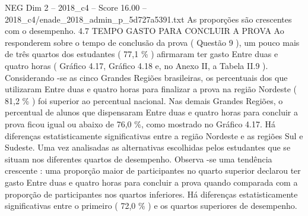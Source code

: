 \begin{textsample}{NEG Dim 2 – 2018\_c4 – Score 16.00 – 2018\_c4/enade\_2018\_admin\_p\_5d727a5391.txt}
As proporções são crescentes com o desempenho. 4.7 TEMPO GASTO PARA CONCLUIR A PROVA Ao responderem sobre o tempo de conclusão da prova ( Questão 9 ), um pouco mais de três quartos dos estudantes ( 77,1 \% ) afirmaram ter gasto Entre duas e quatro horas ( Gráfico 4.17, Gráfico 4.18 e, no Anexo II, a Tabela II.9 ).
Considerando -se as cinco Grandes Regiões brasileiras, os percentuais dos que utilizaram Entre duas e quatro horas para finalizar a prova na região Nordeste ( 81,2 \% ) foi superior ao percentual nacional.
Nas demais Grandes Regiões, o percentual de alunos que dispensaram Entre duas e quatro horas para concluir a prova ficou igual ou abaixo de 76,0 \%, como mostrado no Gráfico 4.17.
Há diferenças estatisticamente significativas entre a região Nordeste e as regiões Sul e Sudeste.
Uma vez analisadas as alternativas escolhidas pelos estudantes que se situam nos diferentes quartos de desempenho.
Observa -se uma tendência crescente : uma proporção maior de participantes no quarto superior declarou ter gasto Entre duas e quatro horas para concluir a prova quando comparada com a proporção de participantes nos quartos inferiores.
Há diferenças estatisticamente significativas entre o primeiro ( 72,0 \% ) e os quartos superiores de desempenho.

\end{textsample}
